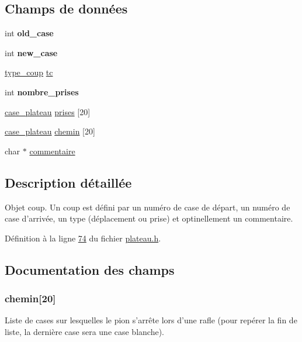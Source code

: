 \subsection*{Champs de données}
\begin{DoxyCompactItemize}
\item 
\hypertarget{structcoup_a7d3cdc0f60034d9940699758db062357}{
int {\bfseries old\_\-case}}
\label{structcoup_a7d3cdc0f60034d9940699758db062357}

\item 
\hypertarget{structcoup_a59e06844f696ebfa6d06977d60276514}{
int {\bfseries new\_\-case}}
\label{structcoup_a59e06844f696ebfa6d06977d60276514}

\item 
\hyperlink{plateau_8h_a9e00f85b4b6ec2d8bdfbe94ff40f0eee}{type\_\-coup} \hyperlink{structcoup_aa33da004dccb192cb33bc00c26c6e859}{tc}
\item 
\hypertarget{structcoup_a8c9c2c766a89b66caa7117708f247b2d}{
int {\bfseries nombre\_\-prises}}
\label{structcoup_a8c9c2c766a89b66caa7117708f247b2d}

\item 
\hyperlink{structcase__plateau}{case\_\-plateau} \hyperlink{structcoup_ae19b3a66d3f4e66b8f69a38e4005f44a}{prises} \mbox{[}20\mbox{]}
\item 
\hyperlink{structcase__plateau}{case\_\-plateau} \hyperlink{structcoup_aa66b88eb8140c2f459ac92fad0796510}{chemin} \mbox{[}20\mbox{]}
\item 
char $\ast$ \hyperlink{structcoup_a8978a8d22b339f32c70e5cb900d4c961}{commentaire}
\end{DoxyCompactItemize}


\subsection{Description détaillée}
Objet coup. Un coup est défini par un numéro de case de départ, un numéro de case d'arrivée, un type (déplacement ou prise) et optinellement un commentaire. 

Définition à la ligne \hyperlink{plateau_8h_source_l00074}{74} du fichier \hyperlink{plateau_8h_source}{plateau.h}.



\subsection{Documentation des champs}
\hypertarget{structcoup_aa66b88eb8140c2f459ac92fad0796510}{
\subsubsection[{chemin}]{ {\bf chemin}\mbox{[}20\mbox{]}}}
\label{structcoup_aa66b88eb8140c2f459ac92fad0796510}
Liste de cases sur lesquelles le pion s'arrête lors d'une rafle (pour repérer la fin de liste, la dernière case sera une case blanche). 

